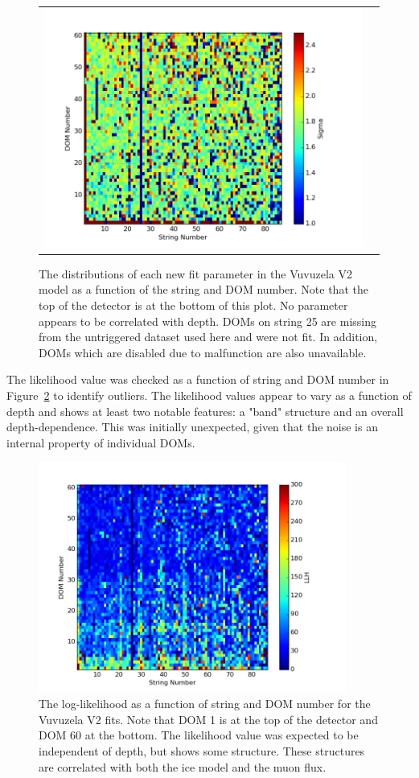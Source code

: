 \begin{figure}[h]
\begin{tabular}{cc}
  	\includegraphics[width=0.5\linewidth]{sigma_occupancy.png} & 
  	\\
\end{tabular}	
\caption[Vuvuzela V2 fit parameters as a function of string and DOM number]{The distributions of each new fit parameter in the Vuvuzela V2 model as a function of the string and DOM number. Note that the top of the detector is at the bottom of this plot. No parameter appears to be correlated with depth. DOMs on string 25 are missing from the untriggered dataset used here and were not fit. In addition, DOMs which are disabled due to malfunction are also unavailable.}
\label{fig:vuvuzela_params_occupancy}
\end{figure}

The likelihood value was checked as a function of string and DOM number in Figure~\ref{fig:llh_vs_depth} to identify outliers.
The likelihood values appear to vary as a function of depth and shows at least two notable features: a "band" structure and an overall depth-dependence.
This was initially unexpected, given that the noise is an internal property of individual DOMs.

\begin{figure}
\centering
\includegraphics[width=0.9\textwidth]{llh.png} 
\caption[Vuvuzela V2 log-likelihood vs string and DOM number]{The log-likelihood as a function of string and DOM number for the Vuvuzela V2 fits. Note that DOM 1 is at the top of the detector and DOM 60 at the bottom. The likelihood value was expected to be independent of depth, but shows some structure. These structures are correlated with both the ice model and the muon flux.}
\label{fig:llh_vs_depth}
\end{figure}

